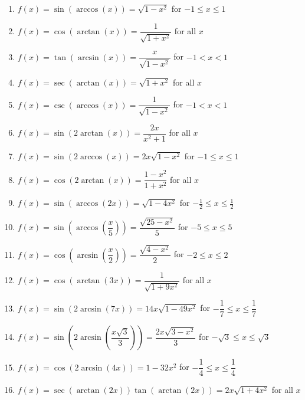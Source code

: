 \begin{enumerate}

\setcounter{enumi}{\value{HW}}

\item $f(x) = \sin \left( \arccos \left( x \right) \right) = \sqrt{1 - x^{2}}$  for $-1 \leq x \leq 1$
\item $f(x) = \cos \left( \arctan \left( x \right) \right) = \dfrac{1}{\sqrt{1 + x^{2}}}$ for all $x$
\item $f(x) =\tan \left( \arcsin \left( x \right) \right) = \dfrac{x}{\sqrt{1 - x^{2}}}$  for $-1 < x < 1$
\item $f(x) =\sec \left( \arctan \left( x \right) \right) = \sqrt{1 + x^{2}}$ for all $x$
\item $f(x) =\csc \left( \arccos \left( x \right) \right) = \dfrac{1}{\sqrt{1 - x^{2}}}$ for $-1 < x < 1$
\item $f(x) =\sin \left( 2\arctan \left( x \right) \right) = \dfrac{2x}{x^{2} + 1}$ for all $x$
\item $f(x) =\sin \left( 2\arccos \left( x \right) \right) = 2x\sqrt{1-x^2}$  for $-1 \leq x \leq 1$
\item $f(x) =\cos \left( 2\arctan \left( x \right) \right) = \dfrac{1 - x^{2}}{1 + x^{2}}$ for all $x$
\item  $f(x) =\sin(\arccos(2x)) = \sqrt{1-4x^2}$ for $-\frac{1}{2} \leq x \leq \frac{1}{2}$
\item  $f(x) =\sin\left(\arccos\left(\dfrac{x}{5}\right)\right) = \dfrac{\sqrt{25-x^2}}{5}$ for $-5 \leq x \leq 5$
\item  $f(x) =\cos\left(\arcsin\left(\dfrac{x}{2}\right)\right) = \dfrac{\sqrt{4-x^2}}{2}$ for $-2 \leq x \leq 2$
\item  $f(x) =\cos\left(\arctan\left(3x\right)\right) = \dfrac{1}{\sqrt{1+9x^{2}}}$ for all $x$
\item  $f(x) =\sin(2\arcsin(7x)) = 14x \sqrt{1-49x^2}$ for $-\dfrac{1}{7} \leq x \leq \dfrac{1}{7}$
\item  $f(x) =\sin\left(2 \arcsin\left( \dfrac{x\sqrt{3}}{3} \right) \right) = \dfrac{2x\sqrt{3-x^2}}{3}$ for $-\sqrt{3} \leq x \leq \sqrt{3}$
\item  $f(x) =\cos(2 \arcsin(4x)) = 1 - 32x^2$ for $-\dfrac{1}{4} \leq x \leq \dfrac{1}{4}$
\item  $f(x) =\sec(\arctan(2x))\tan(\arctan(2x)) = 2x \sqrt{1+4x^2}$ for all $x$



\end{enumerate}
